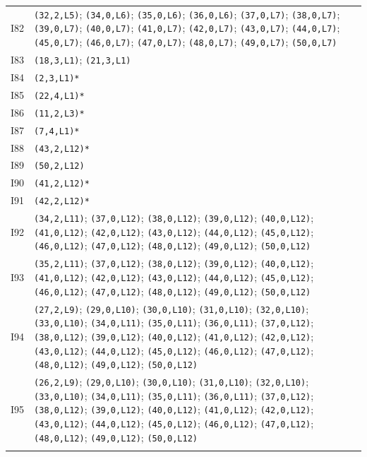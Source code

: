 {\begin{longtable}{@{}r p{14.7cm}@{}}
I82 & \texttt{(32,2,L5)}; \texttt{(34,0,L6)}; \texttt{(35,0,L6)}; \texttt{(36,0,L6)}; \texttt{(37,0,L7)}; \texttt{(38,0,L7)}; \texttt{(39,0,L7)}; \texttt{(40,0,L7)}; \texttt{(41,0,L7)}; \texttt{(42,0,L7)}; \texttt{(43,0,L7)}; \texttt{(44,0,L7)}; \texttt{(45,0,L7)}; \texttt{(46,0,L7)}; \texttt{(47,0,L7)}; \texttt{(48,0,L7)}; \texttt{(49,0,L7)}; \texttt{(50,0,L7)}\\\addlinespace[3pt]
I83 & \texttt{(18,3,L1)}; \texttt{(21,3,L1)}\\\addlinespace[3pt]
I84 & \texttt{(2,3,L1)*}\\\addlinespace[3pt]
I85 & \texttt{(22,4,L1)*}\\\addlinespace[3pt]
I86 & \texttt{(11,2,L3)*}\\\addlinespace[3pt]
I87 & \texttt{(7,4,L1)*}\\\addlinespace[3pt]
I88 & \texttt{(43,2,L12)*}\\\addlinespace[3pt]
I89 & \texttt{(50,2,L12)}\\\addlinespace[3pt]
I90 & \texttt{(41,2,L12)*}\\\addlinespace[3pt]
I91 & \texttt{(42,2,L12)*}\\\addlinespace[3pt]
I92 & \texttt{(34,2,L11)}; \texttt{(37,0,L12)}; \texttt{(38,0,L12)}; \texttt{(39,0,L12)}; \texttt{(40,0,L12)}; \texttt{(41,0,L12)}; \texttt{(42,0,L12)}; \texttt{(43,0,L12)}; \texttt{(44,0,L12)}; \texttt{(45,0,L12)}; \texttt{(46,0,L12)}; \texttt{(47,0,L12)}; \texttt{(48,0,L12)}; \texttt{(49,0,L12)}; \texttt{(50,0,L12)}\\\addlinespace[3pt]
I93 & \texttt{(35,2,L11)}; \texttt{(37,0,L12)}; \texttt{(38,0,L12)}; \texttt{(39,0,L12)}; \texttt{(40,0,L12)}; \texttt{(41,0,L12)}; \texttt{(42,0,L12)}; \texttt{(43,0,L12)}; \texttt{(44,0,L12)}; \texttt{(45,0,L12)}; \texttt{(46,0,L12)}; \texttt{(47,0,L12)}; \texttt{(48,0,L12)}; \texttt{(49,0,L12)}; \texttt{(50,0,L12)}\\\addlinespace[3pt]
I94 & \texttt{(27,2,L9)}; \texttt{(29,0,L10)}; \texttt{(30,0,L10)}; \texttt{(31,0,L10)}; \texttt{(32,0,L10)}; \texttt{(33,0,L10)}; \texttt{(34,0,L11)}; \texttt{(35,0,L11)}; \texttt{(36,0,L11)}; \texttt{(37,0,L12)}; \texttt{(38,0,L12)}; \texttt{(39,0,L12)}; \texttt{(40,0,L12)}; \texttt{(41,0,L12)}; \texttt{(42,0,L12)}; \texttt{(43,0,L12)}; \texttt{(44,0,L12)}; \texttt{(45,0,L12)}; \texttt{(46,0,L12)}; \texttt{(47,0,L12)}; \texttt{(48,0,L12)}; \texttt{(49,0,L12)}; \texttt{(50,0,L12)}\\\addlinespace[3pt]
I95 & \texttt{(26,2,L9)}; \texttt{(29,0,L10)}; \texttt{(30,0,L10)}; \texttt{(31,0,L10)}; \texttt{(32,0,L10)}; \texttt{(33,0,L10)}; \texttt{(34,0,L11)}; \texttt{(35,0,L11)}; \texttt{(36,0,L11)}; \texttt{(37,0,L12)}; \texttt{(38,0,L12)}; \texttt{(39,0,L12)}; \texttt{(40,0,L12)}; \texttt{(41,0,L12)}; \texttt{(42,0,L12)}; \texttt{(43,0,L12)}; \texttt{(44,0,L12)}; \texttt{(45,0,L12)}; \texttt{(46,0,L12)}; \texttt{(47,0,L12)}; \texttt{(48,0,L12)}; \texttt{(49,0,L12)}; \texttt{(50,0,L12)}\\\addlinespace[3pt]

\end{longtable}}
